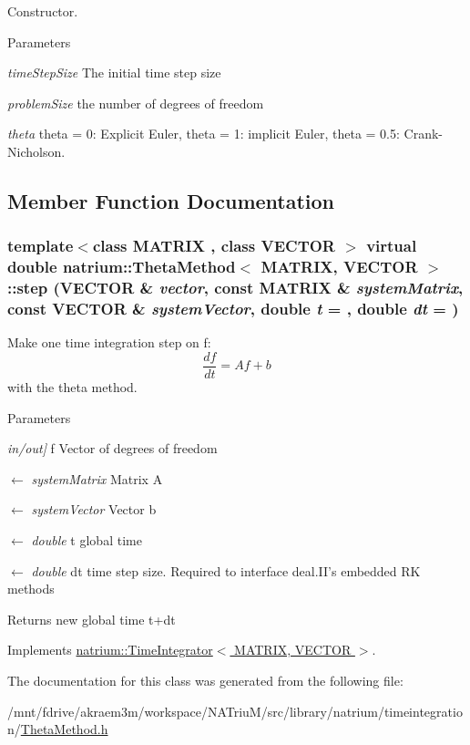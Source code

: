 Constructor. 
\begin{DoxyParams}{Parameters}
\item[{\em timeStepSize}]The initial time step size \item[{\em problemSize}]the number of degrees of freedom \item[{\em theta}]theta = 0: Explicit Euler, theta = 1: implicit Euler, theta = 0.5: Crank-\/Nicholson. \end{DoxyParams}


\subsection{Member Function Documentation}
\hypertarget{classnatrium_1_1ThetaMethod_a247c639f49a05904dae01b05115bc7e4}{
\subsubsection[{step}]{\setlength{\rightskip}{0pt plus 5cm}template$<$class MATRIX , class VECTOR $>$ virtual double {\bf natrium::ThetaMethod}$<$ MATRIX, VECTOR $>$::step (VECTOR \& {\em vector}, \/  const MATRIX \& {\em systemMatrix}, \/  const VECTOR \& {\em systemVector}, \/  double {\em t} = {}, \/  double {\em dt} = {})}}
\label{classnatrium_1_1ThetaMethod_a247c639f49a05904dae01b05115bc7e4}


Make one time integration step on f: \[ \frac{df}{dt} = Af+b \] with the theta method. 
\begin{DoxyParams}{Parameters}
\item[{\em in/out\mbox{]}}]f Vector of degrees of freedom \item[\mbox{$\leftarrow$} {\em systemMatrix}]Matrix A \item[\mbox{$\leftarrow$} {\em systemVector}]Vector b \item[\mbox{$\leftarrow$} {\em double}]t global time \item[\mbox{$\leftarrow$} {\em double}]dt time step size. Required to interface deal.II's embedded RK methods \end{DoxyParams}
\begin{DoxyReturn}{Returns}
new global time t+dt 
\end{DoxyReturn}


Implements \hyperlink{classnatrium_1_1TimeIntegrator_a1c438e41d183d172d524aa5dc97785fb}{natrium::TimeIntegrator$<$ MATRIX, VECTOR $>$}.

The documentation for this class was generated from the following file:\begin{DoxyCompactItemize}
\item 
/mnt/fdrive/akraem3m/workspace/NATriuM/src/library/natrium/timeintegration/\hyperlink{ThetaMethod_8h}{ThetaMethod.h}\end{DoxyCompactItemize}
